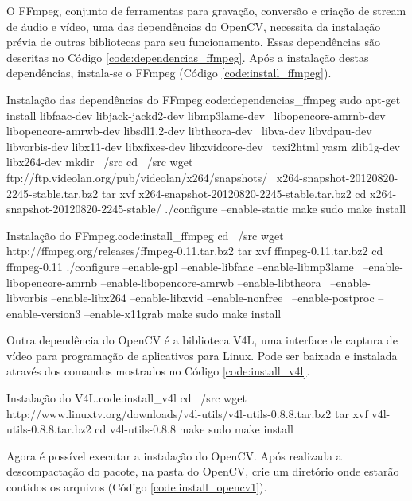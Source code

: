 O FFmpeg, conjunto de ferramentas para gravação, conversão e criação de stream de áudio e vídeo, uma das dependências do OpenCV, necessita da instalação prévia de outras bibliotecas para seu funcionamento. Essas dependências são descritas no Código \ref{code:dependencias_ffmpeg}. Após a instalação destas dependências, instala-se o FFmpeg (Código \ref{code:install_ffmpeg}).

\begin{terminal}{Instalação das dependências do FFmpeg.}{code:dependencias_ffmpeg}
sudo apt-get install libfaac-dev libjack-jackd2-dev libmp3lame-dev \
  libopencore-amrnb-dev libopencore-amrwb-dev libsdl1.2-dev libtheora-dev \
  libva-dev libvdpau-dev libvorbis-dev libx11-dev libxfixes-dev libxvidcore-dev \
  texi2html yasm zlib1g-dev libx264-dev
mkdir ~/src
cd ~/src
wget ftp://ftp.videolan.org/pub/videolan/x264/snapshots/ \
	x264-snapshot-20120820-2245-stable.tar.bz2
tar xvf x264-snapshot-20120820-2245-stable.tar.bz2
cd x264-snapshot-20120820-2245-stable/
./configure --enable-static
make
sudo make install
\end{terminal}

\begin{terminal}{Instalação do FFmpeg.}{code:install_ffmpeg}
cd ~/src
wget http://ffmpeg.org/releases/ffmpeg-0.11.tar.bz2
tar xvf ffmpeg-0.11.tar.bz2
cd ffmpeg-0.11
./configure --enable-gpl --enable-libfaac --enable-libmp3lame \
  --enable-libopencore-amrnb --enable-libopencore-amrwb --enable-libtheora \
  --enable-libvorbis --enable-libx264 --enable-libxvid --enable-nonfree \
  --enable-postproc --enable-version3 --enable-x11grab
make
sudo make install
\end{terminal}

Outra dependência do OpenCV é a biblioteca V4L, uma interface de captura de vídeo para programação de aplicativos para Linux. Pode ser baixada e instalada através dos comandos mostrados no Código \ref{code:install_v4l}.

\begin{terminal}{Instalação do V4L.}{code:install_v4l}
cd ~/src
wget http://www.linuxtv.org/downloads/v4l-utils/v4l-utils-0.8.8.tar.bz2
tar xvf v4l-utils-0.8.8.tar.bz2
cd v4l-utils-0.8.8
make
sudo make install
\end{terminal}

Agora é possível executar a instalação do OpenCV. Após realizada a descompactação do pacote, na pasta do OpenCV, crie um diretório onde estarão contidos os arquivos (Código \ref{code:install_opencv1}).

